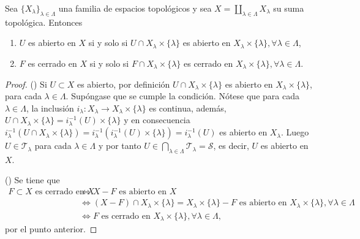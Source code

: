 

\begin{theorem}
Sea $\{ X_{\lambda} \}_{\lambda \in \Lambda}$ una familia de espacios topológicos y sea $X = \coprod_{\lambda \in \Lambda} X_{\lambda}$ su suma topológica. Entonces
\begin{enumerate}[label=\textnormal{(\roman*)}]
\item $U$ es abierto en $X$ si y solo si $U \cap X_{\lambda} \times \{ \lambda \}$ es abierto en $X_{\lambda} \times \{ \lambda \},\forall \lambda \in \Lambda$,
\item $F$ es cerrado en $X$ si y solo si $F \cap X_{\lambda} \times \{ \lambda \}$ es cerrado en $X_{\lambda} \times \{ \lambda \},\forall \lambda \in \Lambda$.
\end{enumerate}
\end{theorem}

\begin{proof}
({\scshape{}}) Si $U \subset X$ es abierto, por definición $U \cap X_{\lambda} \times \{ \lambda \}$ es abierto en $X_{\lambda} \times \{ \lambda \}$, para cada $\lambda \in \Lambda$. Supóngase que se cumple la condición. Nótese que para cada $\lambda \in \Lambda$, la inclusión $i_{\lambda} : X_{\lambda} \longrightarrow X_{\lambda} \times \{ \lambda \}$ es continua, además, $U \cap X_{\lambda} \times \{ \lambda \} = i^{-1}_{\lambda}(U) \times \{ \lambda \}$ y en consecuencia $i^{-1}_{\lambda}(U \cap X_{\lambda }\times \{ \lambda \}) = i^{-1}_{\lambda}(i^{-1}_{\lambda}(U) \times \{ \lambda \}) = i^{-1}_{\lambda}(U)$ es abierto en $X_{\lambda}$. Luego $U \in \mathcal{T}_{\lambda}$ para cada $\lambda \in \Lambda$ y por tanto $U \in \bigcap_{\lambda \in \Lambda} \mathcal{T}_{\lambda} = \mathcal{S}$, es decir, $U$ es abierto en $X$.
\bigskip

({\scshape{}}) Se tiene que
\begin{align*}
    F \subset X \text{ es cerrado en } X & \iff X - F \text{ es abierto en } X \\
                                           & \iff (X - F) \cap X_{\lambda} \times \{ \lambda \} = X_{\lambda} \times \{ \lambda \} - F \text{ es abierto en } X_{\lambda} \times \{ \lambda \}, \forall \lambda \in \Lambda \\
                                           & \iff F \text{ es cerrado en } X_{\lambda} \times \{ \lambda \}, \forall \lambda \in \Lambda,
\end{align*}
por el punto anterior.
\end{proof}

